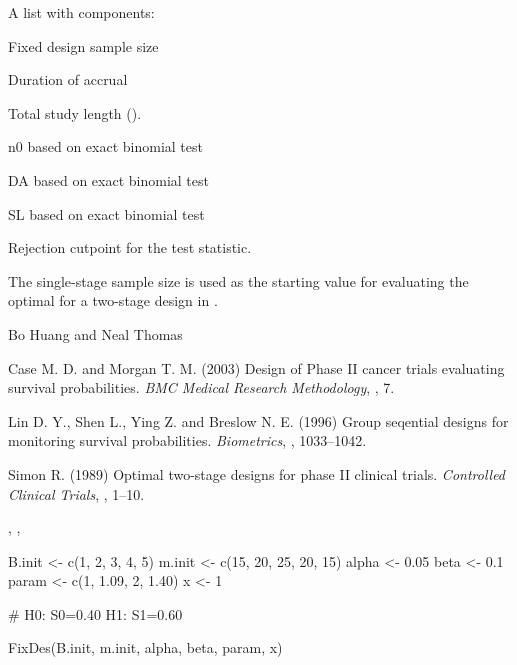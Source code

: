 \begin{Value}
A list with components:
\begin{ldescription}
\item[\code{n0}] Fixed design sample size
\item[\code{DA}] Duration of accrual
\item[\code{SL}] Total study length ().
\item[\code{n0E}] n0 based on exact binomial test
\item[\code{DAE}] DA based on exact binomial test
\item[\code{SLE}] SL based on exact binomial test
\item[\code{C}] Rejection cutpoint for the test statistic.
\end{ldescription}
\end{Value}
\begin{Note}\relax
The single-stage sample size is used as the starting value for evaluating the
optimal  for a two-stage design in .
\end{Note}
\begin{Author}\relax
Bo Huang  and Neal Thomas
\end{Author}
\begin{References}\relax
Case M. D. and Morgan T. M. (2003) Design of Phase II cancer trials
evaluating survival probabilities. \emph{BMC Medical Research
Methodology}, , 7.

Lin D. Y., Shen L., Ying Z. and Breslow N. E. (1996) Group seqential
designs for monitoring survival probabilities. \emph{Biometrics},
, 1033--1042.

Simon R. (1989) Optimal two-stage designs for phase II clinical
trials. \emph{Controlled Clinical Trials}, , 1--10.
\end{References}
\begin{SeeAlso}\relax
{}, , 
\end{SeeAlso}
\begin{Examples}
\begin{ExampleCode}
B.init <- c(1, 2, 3, 4, 5)
m.init <- c(15, 20, 25, 20, 15)
alpha <- 0.05
beta <- 0.1
param <- c(1, 1.09, 2, 1.40)
x <- 1

# H0: S0=0.40 H1: S1=0.60

FixDes(B.init, m.init, alpha, beta, param, x)

\end{ExampleCode}
\end{Examples}

